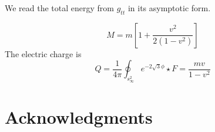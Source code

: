 \documentclass[10.5pt,letterpaper]{article}
\renewcommand{\(}{\left(}
\renewcommand{\)}{\right)}
\renewcommand{\[}{\left[}
\renewcommand{\]}{\right]}
\begin{document}
We read the total energy from $g_{tt}$ in its asymptotic form.

\begin{equation}
M=m\left[1+\frac{v^2}{2(1-v^2)}\right]
\end{equation}
The electric charge is
\begin{equation}
Q=\frac{1}{4\pi}\oint_{s^2_\infty}{e^{-2\sqrt{3}\phi}\star F}=\frac{mv}{1-v^2}
\end{equation}


\section*{\normalsize Acknowledgments}
\vspace{-5pt}






\newpage

\hypersetup{linkcolor=blue}

\end{document}
